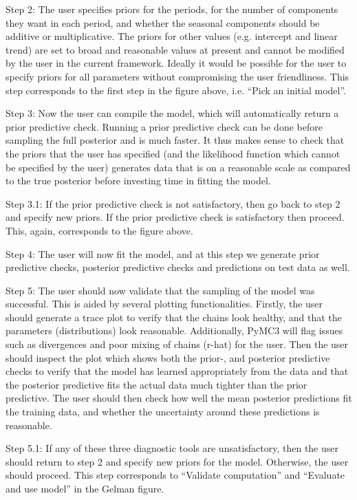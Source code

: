 \documentclass{article}
\begin{document}
Step 2: The user specifies priors for the periods, for the number of components they want in each period, and whether the seasonal components should be additive or multiplicative. The priors for other values (e.g. intercept and linear trend) are set to broad and reasonable values at present and cannot be modified by the user in the current framework. Ideally it would be possible for the user to specify priors for all parameters without compromising the user friendliness. This step corresponds to the first step in the figure above, i.e. “Pick an initial model”. 

Step 3: Now the user can compile the model, which will automatically return a prior predictive check. Running a prior predictive check can be done before sampling the full posterior and is much faster. It thus makes sense to check that the priors that the user has specified (and the likelihood function which cannot be specified by the user) generates data that is on a reasonable scale as compared to the true posterior before investing time in fitting the model.

Step 3.1: If the prior predictive check is not satisfactory, then go back to step 2 and specify new priors. If the prior predictive check is satisfactory then proceed. This, again, corresponds to the figure above.

Step 4: The user will now fit the model, and at this step we generate prior predictive checks, posterior predictive checks and predictions on test data as well. 

Step 5:  The user should now validate that the sampling of the model was successful. This is aided by several plotting functionalities. Firstly, the user should generate a trace plot to verify that the chains look healthy, and that the parameters (distributions) look reasonable. Additionally, PyMC3 will flag issues such as divergences and poor mixing of chains (r-hat) for the user. Then the user should inspect the plot which shows both the prior-, and posterior predictive checks to verify that the model has learned appropriately from the data and that the posterior predictive fits the actual data much tighter than the prior predictive. The user should then check how well the mean posterior predictions fit the training data, and whether the uncertainty around these predictions is reasonable. 

Step 5.1: If any of these three diagnostic tools are unsatisfactory, then the user should return to step 2 and specify new priors for the model. Otherwise, the user should proceed. This step corresponds to “Validate computation” and “Evaluate and use model” in the Gelman figure.
\end{document}
